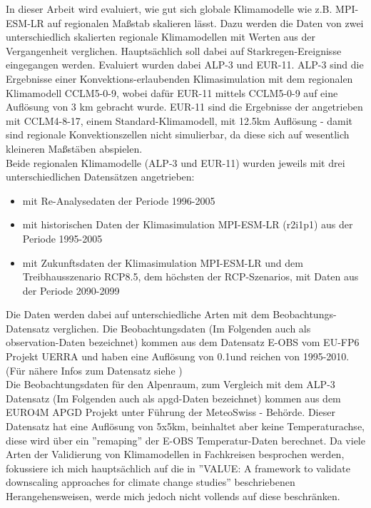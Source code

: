 In dieser Arbeit wird evaluiert, wie gut sich globale Klimamodelle wie z.B. MPI-ESM-LR auf regionalen Maßstab skalieren lässt. Dazu werden die Daten von zwei unterschiedlich skalierten regionale Klimamodellen mit Werten aus der Vergangenheit verglichen. Hauptsächlich soll dabei auf Starkregen-Ereignisse eingegangen werden. Evaluiert wurden dabei ALP-3 und EUR-11. ALP-3 sind  die Ergebnisse einer Konvektions-erlaubenden Klimasimulation mit dem regionalen Klimamodell CCLM5-0-9, wobei dafür EUR-11 mittels CCLM5-0-9 auf eine Auflösung von 3 km gebracht wurde. EUR-11 sind die Ergebnisse der angetrieben mit CCLM4-8-17, einem Standard-Klimamodell, mit 12.5km Auflösung - damit sind regionale Konvektionszellen nicht simulierbar, da diese sich auf wesentlich kleineren Maßstäben abspielen.\\
Beide regionalen Klimamodelle (ALP-3 und EUR-11) wurden jeweils mit drei unterschiedlichen Datensätzen angetrieben: 
\begin{itemize}
	\item mit Re-Analysedaten der Periode 1996-2005
	\item mit historischen Daten der Klimasimulation MPI-ESM-LR (r2i1p1) aus der Periode 1995-2005
	\item mit Zukunftsdaten der Klimasimulation MPI-ESM-LR und dem Treibhausszenario RCP8.5, dem höchsten der RCP-Szenarios, mit Daten aus der Periode 2090-2099
\end{itemize}
Die Daten werden dabei auf unterschiedliche Arten mit dem Beobachtungs-Datensatz verglichen. Die Beobachtungsdaten (Im Folgenden auch als observation-Daten bezeichnet) kommen aus dem Datensatz  E-OBS vom EU-FP6 Projekt UERRA und haben eine Auflösung von 0.1\degree und reichen von 1995-2010. (Für nähere Infos zum Datensatz siehe \cite{eobs})\\
Die Beobachtungsdaten für den Alpenraum, zum Vergleich mit dem ALP-3 Datensatz (Im Folgenden auch als apgd-Daten bezeichnet) kommen aus dem EURO4M APGD Projekt unter Führung der MeteoSwiss - Behörde\cite{meteoswiss}. Dieser Datensatz hat eine Auflösung von 5x5km, beinhaltet aber keine Temperaturachse, diese wird über ein ''remaping'' der E-OBS Temperatur-Daten berechnet.
Da viele Arten der Validierung von Klimamodellen in Fachkreisen besprochen werden, fokussiere ich mich hauptsächlich auf die in ''VALUE: A framework to validate downscaling approaches for climate change studies'' \cite{maraun_value} beschriebenen Herangehensweisen, werde mich jedoch nicht vollends auf diese beschränken.